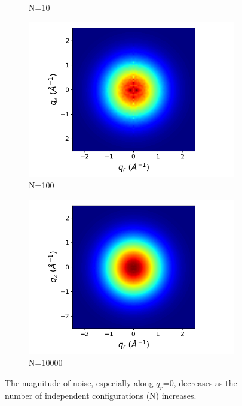 \documentclass{article}
\begin{document}
\begin{figure}[!htb]
\begin{subfigure}{0.45\linewidth}
  \caption{N=10}
  \end{subfigure}
  \begin{subfigure}{0.45\linewidth}
  \centering
  \includegraphics[width=\textwidth]{xrd_100frame.png}
  \caption{N=100}
  \end{subfigure}
  \begin{subfigure}{0.45\linewidth}
  \centering
  \includegraphics[width=\textwidth]{xrd_10000frame.png}
  \caption{N=10000}
  \end{subfigure}
  \caption{The magnitude of noise, especially along $q_r$=0, decreases
  as the number of independent configurations (N) increases.}\label{fig:xrd_noise}
  \end{figure}
  
\end{document}
